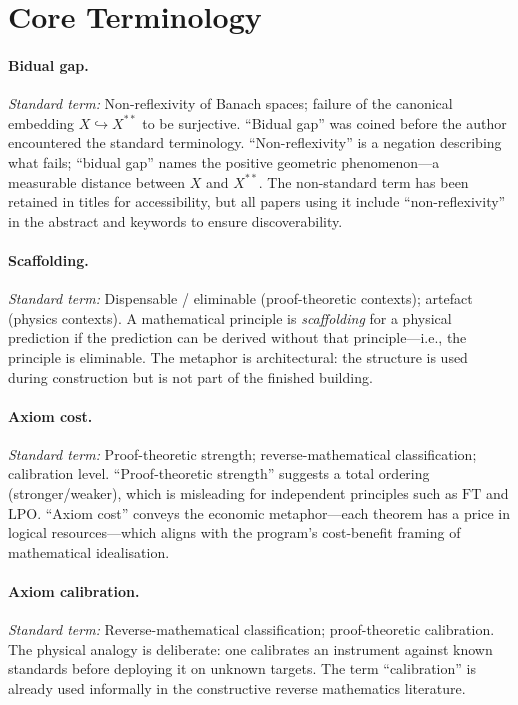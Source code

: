 \documentclass[11pt,a4paper]{report}
\theoremstyle{plain}
\theoremstyle{definition}
\theoremstyle{remark}
\newcommand{\LPO}{\mathrm{LPO}}
\newcommand{\FT}{\mathrm{FT}}
\begin{document}
\section{Core Terminology}

\paragraph{Bidual gap.}
\emph{Standard term:} Non-reflexivity of Banach spaces; failure of the canonical embedding $X\hookrightarrow X^{**}$ to be surjective.\quad
``Bidual gap'' was coined before the author encountered the standard terminology.  ``Non-reflexivity'' is a negation describing what fails; ``bidual gap'' names the positive geometric phenomenon---a measurable distance between $X$ and $X^{**}$.  The non-standard term has been retained in titles for accessibility, but all papers using it include ``non-reflexivity'' in the abstract and keywords to ensure discoverability.

\paragraph{Scaffolding.}
\emph{Standard term:} Dispensable / eliminable (proof-theoretic contexts); artefact (physics contexts).\quad
A mathematical principle is \emph{scaffolding} for a physical prediction if the prediction can be derived without that principle---i.e., the principle is eliminable.  The metaphor is architectural: the structure is used during construction but is not part of the finished building.

\paragraph{Axiom cost.}
\emph{Standard term:} Proof-theoretic strength; reverse-mathematical classification; calibration level.\quad
``Proof-theoretic strength'' suggests a total ordering (stronger/weaker), which is misleading for independent principles such as $\FT$ and $\LPO$.  ``Axiom cost'' conveys the economic metaphor---each theorem has a price in logical resources---which aligns with the program's cost-benefit framing of mathematical idealisation.

\paragraph{Axiom calibration.}
\emph{Standard term:} Reverse-mathematical classification; proof-theoretic calibration.\quad
The physical analogy is deliberate: one calibrates an instrument against known standards before deploying it on unknown targets.  The term ``calibration'' is already used informally in the constructive reverse mathematics literature.
\end{document}
